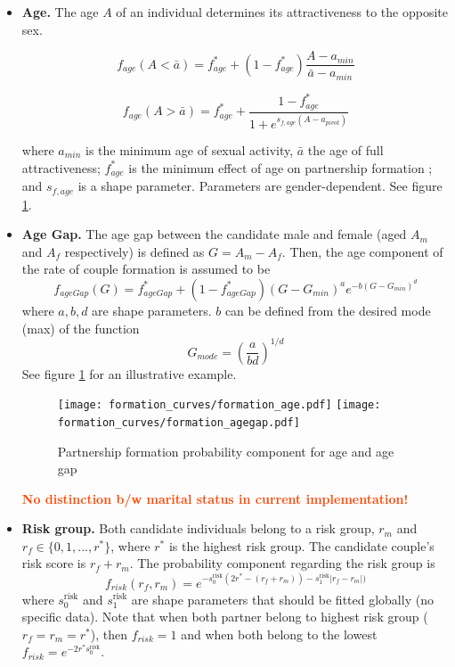 \documentclass[11pt, onecolumn]{article}
\newcommand{\warning}[1]{\textbf{\textcolor{OrangeRed}{#1}}}
\begin{document}
\begin{itemize}

\item \textbf{Age.} The age $A$ of an individual determines its attractiveness to the opposite sex. 

$$ f_{age}(A < \bar{a})  = f_{age}^* + (1-f_{age}^*)\frac{A - a_{min}}{\bar{a} - a_{min}} $$

$$ f_{age}(A > \bar{a})  =  f_{age}^* + \frac{1-f_{age}^*}{1+e^{s_{f,age}(A-a_{pivot})}}   $$

where $a_{min}$ is the minimum age of sexual activity, $\bar{a}$ the age of full attractiveness; $ f_{age}^*$ is the minimum effect of age on partnership formation ; and $s_{f,age}$ is a shape parameter. Parameters are gender-dependent. See figure \ref{fig:formationAge}.


\item \textbf{Age Gap.} 
The age gap between the candidate male and female  (aged $A_m$ and $A_f$ respectively)  is defined as $G=A_m-A_f$. Then, the age component of the rate of couple formation is assumed to be
$$f_{ageGap}(G) = f_{ageGap}^* + (1-f_{ageGap}^*) (G-G_{min})^a e^{-b(G-G_{min})^d}$$
where $a,b,d$ are shape parameters. $b$ can be defined from the desired mode (max) of the function
$$G_{mode} = \left(\frac{a}{bd}\right)^{1/d}$$
See figure \ref{fig:formationAge} for an illustrative example.

\begin{figure}[ht]
\centering
    \texttt{[image: formation\_curves/formation\_age.pdf]}
    \texttt{[image: formation\_curves/formation\_agegap.pdf]}
\caption{Partnership formation probability component for age and age gap}
\label{fig:formationAge}
\end{figure}

\warning{No distinction b/w marital status in current implementation!}

\item \textbf{Risk group.} Both candidate individuals belong to a risk group, $r_m$ and $r_f\in \{0,1,...,r^*\}$, where $r^*$ is the highest risk group. The candidate couple's risk score is $r_f+r_m$. The probability component regarding the risk group is
$$f_{risk}(r_f,r_m) = e^{-s^{\mathrm{risk}}_0(2r^*-(r_f+r_m))-s^{\mathrm{risk}}_1 |r_f-r_m|)}$$
where $s^{\mathrm{risk}}_0$ and $s^{\mathrm{risk}}_1$ are shape parameters that should be fitted globally (no specific data). Note that when both partner belong to highest risk group ($r_f=r_m=r^*$), then $f_{risk}=1$ and when both belong to the lowest $f_{risk}=e^{-2r^*s^{\mathrm{risk}}_0}$.


\end{itemize}
\end{document}
